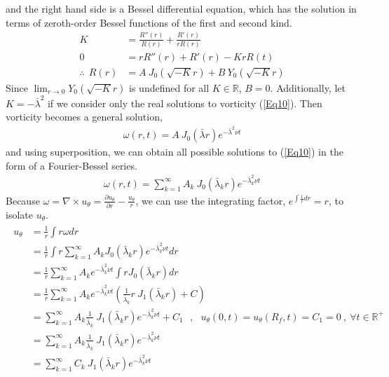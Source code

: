 \documentclass{article}
\begin{document}
and the right hand side is a Bessel differential equation, which has the solution in terms of zeroth-order Bessel functions of the first and second kind.
\begin{align*}
    K&=\frac{R''(r)}{R(r)}+\frac{R'(r)}{rR(r)}\\
    0&= rR''(r)+R'(r)-KrR(t) \\
    \therefore \:\: R(r)&= A \:J_0 \left(\sqrt{-K} r\right)+B \:Y_0 \left(\sqrt{-K} r\right)
\end{align*}
Since $\displaystyle \lim_{r \to 0} Y_0 \left(\sqrt{-K} r\right)$ is undefined for all $K\in \mathbb{R}$, $B=0$. Additionally, let $K=-\bar{\lambda}^2$ if we consider only the real solutions to vorticity (\ref{Eq10}). Then vorticity becomes a general solution,
\begin{align*}
    \omega (r,t) = A \:J_0 \left(\bar{\lambda} r\right)e^{-\bar{\lambda}^2 \nu t}
\end{align*}
and using superposition, we can obtain all possible solutions to (\ref{Eq10}) in the form of a Fourier-Bessel series.
\begin{align*}
    \omega (r,t) =\sum_{k=1}^{\infty} A_k \:J_0 \left(\bar{\lambda}_k r\right)e^{-\bar{\lambda}_k^2 \nu t}
\end{align*}
Because $\omega = \nabla \times u_\theta = \frac{\partial u_\theta}{\partial r} -\frac{u_\theta}{r}$, we can use the integrating factor, $e^{\int \frac{1}{r} dr}=r$, to isolate $u_\theta$.
\begin{align}\label{Eq11}
\begin{split}
    u_\theta &= \frac{1}{r}\int r\omega dr \\
    &= \frac{1}{r}\int r \sum_{k=1}^{\infty} A_k J_0 \left(\bar{\lambda}_k r \right)e^{-\bar{\lambda}_k^2\nu t} dr \\
    &= \frac{1}{r} \sum_{k=1}^{\infty} A_k e^{-\bar{\lambda}_k^2 \nu t} \int r  J_0 \left(\bar{\lambda}_k r \right) dr \\
    &= \frac{1}{r} \sum_{k=1}^{\infty} A_k e^{-\bar{\lambda}_k^2 \nu t} \left (\frac{1}{\bar{\lambda}_k}r \: J_1\left(\bar{\lambda}_k r \right)+C \right)\\
    &= \sum_{k=1}^{\infty} A_k \frac{1}{\bar{\lambda}_k} \: J_1\left(\bar{\lambda}_k r \right) e^{-\bar{\lambda}_k^2\nu t} +C_1  \:\:\:,\:\:\: u_\theta (0,t)=u_\theta (R_f,t)=C_1=0 \:,\: \forall t\in \mathbb{R}^+\\
    &= \sum_{k=1}^{\infty} A_k \frac{1}{\bar{\lambda}_k} \: J_1\left(\bar{\lambda}_k r \right) e^{-\bar{\lambda}_k^2 \nu t}\\
    &= \sum_{k=1}^{\infty} C_k \: J_1\left(\bar{\lambda}_k r \right) e^{-\bar{\lambda}_k^2 \nu t}
\end{split}
\end{align}
\end{document}
